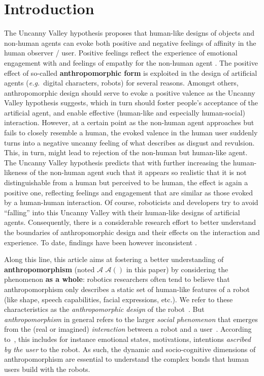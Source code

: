 \documentclass{frontiersSCNS} %
\newcommand{\eg}{{\textit{e.g.~}}}
\newcommand{\Ant}[1][]{%
      \ifthenelse{\isempty{#1}}%
        {$\mathcal{A}$}
        {$\mathcal{A}(#1)$}
}
\begin{document}
\section{Introduction}
\label{sec:intro}

The Uncanny Valley hypothesis \citep{mori_uncanny_1970} proposes that human-like
designs of objects and non-human agents can evoke both positive and negative feelings 
of affinity in the human observer / user. Positive feelings reflect the experience of 
emotional engagement with and feelings of empathy for the non-human agent
\citep{cheetham_human_2011}. The positive effect of so-called
\textbf{anthropomorphic form} is exploited in the design of artificial agents
(\eg digital characters, robots) for several reasons. Amongst others,
anthropomorphic design should serve to evoke a positive valence as the Uncanny
Valley hypothesis suggests, which in turn should foster people's acceptance of
the artificial agent, and enable effective (human-like and especially
human-social) interaction.  However, at a certain point as the non-human agent
approaches but fails to closely resemble a human, the evoked valence in the
human user suddenly turns into a negative uncanny feeling of what
\cite{mori_uncanny_1970} describes as disgust and revulsion. This, in turn,
might lead to rejection of the non-human but human-like agent.  The Uncanny
Valley hypothesis predicts that with further increasing the human-likeness of
the non-human agent such that it appears so realistic that it is not
distinguishable from a human but perceived to be human, the effect is again a
positive one, reflecting feelings and engagement that are similar as those
evoked by a human-human interaction.  Of course, roboticists and developers try
to avoid ``falling'' into this Uncanny Valley with their human-like designs of
artificial agents. Consequently, there is a considerable research effort to
better understand the boundaries of anthropomorphic design and their effects
on the interaction and experience. To date, findings have been however
inconsistent \citep{cheetham_human_2011}.

Along this line, this article aims at fostering a better understanding of
\textbf{anthropomorphism} (noted \Ant in this paper) by considering the phenomenon
\textbf{as a whole}: robotics researchers often tend to believe that
anthropomorphism only describes a static set of human-like features of a robot
(like shape, speech capabilities, facial expressions, etc.). We refer to these
characteristics as the \emph{anthropomorphic design} of the
robot~\cite{fink_anthropomorphism_2012}. But \emph{anthropomorphism} in general
refers to the larger \emph{social phenomenon} that emerges from the (real or
imagined) \emph{interaction} between a robot and a
user~\citep{persson_anthropomorphism_2000}. According to~\cite{epley_when_2008},
this includes for instance emotional states, motivations, intentions
\emph{ascribed by the user} to the robot. As such, the dynamic and
socio-cognitive dimensions of anthropomorphism are essential to understand the
complex bonds that human users build with the robots.
\end{document}
